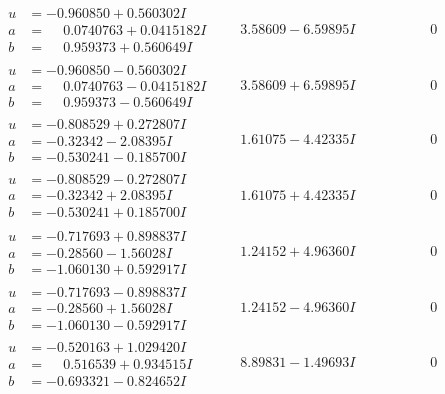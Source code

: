 \documentclass[1p]{elsarticle_modified}
\theoremstyle{definition}
\begin{document}
$$\begin{array}{c|c|c}
\begin{aligned}
u &= -0.960850 + 0.560302 I \\
a &= \phantom{-}0.0740763 + 0.0415182 I \\
b &= \phantom{-}0.959373 + 0.560649 I\end{aligned}
 & \phantom{-}3.58609 - 6.59895 I & \phantom{-0.000000 } 0 \\ \hline\begin{aligned}
u &= -0.960850 - 0.560302 I \\
a &= \phantom{-}0.0740763 - 0.0415182 I \\
b &= \phantom{-}0.959373 - 0.560649 I\end{aligned}
 & \phantom{-}3.58609 + 6.59895 I & \phantom{-0.000000 } 0 \\ \hline\begin{aligned}
u &= -0.808529 + 0.272807 I \\
a &= -0.32342 - 2.08395 I \\
b &= -0.530241 - 0.185700 I\end{aligned}
 & \phantom{-}1.61075 - 4.42335 I & \phantom{-0.000000 } 0 \\ \hline\begin{aligned}
u &= -0.808529 - 0.272807 I \\
a &= -0.32342 + 2.08395 I \\
b &= -0.530241 + 0.185700 I\end{aligned}
 & \phantom{-}1.61075 + 4.42335 I & \phantom{-0.000000 } 0 \\ \hline\begin{aligned}
u &= -0.717693 + 0.898837 I \\
a &= -0.28560 - 1.56028 I \\
b &= -1.060130 + 0.592917 I\end{aligned}
 & \phantom{-}1.24152 + 4.96360 I & \phantom{-0.000000 } 0 \\ \hline\begin{aligned}
u &= -0.717693 - 0.898837 I \\
a &= -0.28560 + 1.56028 I \\
b &= -1.060130 - 0.592917 I\end{aligned}
 & \phantom{-}1.24152 - 4.96360 I & \phantom{-0.000000 } 0 \\ \hline\begin{aligned}
u &= -0.520163 + 1.029420 I \\
a &= \phantom{-}0.516539 + 0.934515 I \\
b &= -0.693321 - 0.824652 I\end{aligned}
 & \phantom{-}8.89831 - 1.49693 I & \phantom{-0.000000 } 0 \\ \hline\begin{aligned}

\end{aligned}
\end{array}$$
\end{document}
